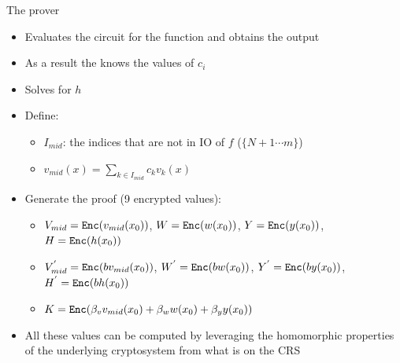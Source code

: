 \documentclass[handout]{beamer}
\begin{document}
\begin{frame}{The prover}
\begin{itemize}
    \item Evaluates the circuit for the function and obtains the output \pause
    \item As a result the \prv knows the values of $c_i$ \pause
    \item Solves for $h$ \pause
    \item Define:
    \begin{itemize}
        \item $I_{mid}$: the indices that are not in IO of $f$ ($ \{ N+1 \cdots m \} $) \pause
        \item $v_{mid}(x) = \sum_{k \in I_{mid}} c_k v_k(x)$ \pause
    \end{itemize}
    \item Generate the proof (9 encrypted values): \pause
    \begin{itemize}
        \item $V_{mid} = \mathtt{Enc}(v_{mid}(x_0))$, $W = \mathtt{Enc}(w(x_0))$,  
        $Y=\mathtt{Enc}(y(x_0))$, $H = \mathtt{Enc}(h(x_0))$ \pause
        \item $V_{mid}^{'} = \mathtt{Enc}(b v_{mid}(x_0))$, $W^{'} = \mathtt{Enc}(b w(x_0))$, $Y^{'}=\mathtt{Enc}(by(x_0))$, $H^{'} = \mathtt{Enc}(bh(x_0))$ \pause
        \item $K = \mathtt{Enc}(\beta_v v_{mid}(x_0) + \beta_w w(x_0)+\beta_y y(x_0)) $ \pause
    \end{itemize}
    \item All these values can be computed by leveraging the homomorphic properties of the underlying cryptosystem from what is on the CRS 
\end{itemize}
\end{frame}
\end{document}
